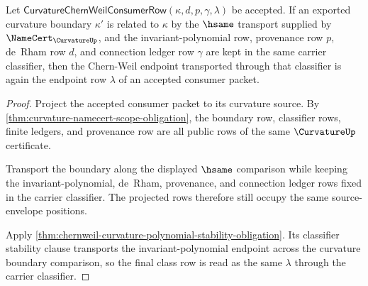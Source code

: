 \begin{theorem}
\label{thm:curvature-chernweil-consumer-stability}
Let $\mathsf{CurvatureChernWeilConsumerRow}(\kappa,d,p,\gamma,\lambda)$ be accepted. If an exported curvature boundary $\kappa'$ is related to $\kappa$ by the $\hsame$ transport supplied by $\NameCert_{\CurvatureUp}$, and the invariant-polynomial row, provenance row $p$, de~Rham row $d$, and connection ledger row $\gamma$ are kept in the same carrier classifier, then the Chern-Weil endpoint transported through that classifier is again the endpoint row $\lambda$ of an accepted consumer packet.
\end{theorem}
\begin{proof}
Project the accepted consumer packet to its curvature source. By \autoref{thm:curvature-namecert-scope-obligation}, the boundary row, classifier rows, finite ledgers, and provenance row are all public rows of the same $\CurvatureUp$ certificate.

Transport the boundary along the displayed $\hsame$ comparison while keeping the invariant-polynomial, de~Rham, provenance, and connection ledger rows fixed in the carrier classifier. The projected rows therefore still occupy the same source-envelope positions.

Apply \autoref{thm:chernweil-curvature-polynomial-stability-obligation}. Its classifier stability clause transports the invariant-polynomial endpoint across the curvature boundary comparison, so the final class row is read as the same $\lambda$ through the carrier classifier.
\end{proof}

